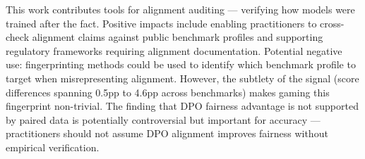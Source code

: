 This work contributes tools for alignment auditing --- verifying how models were trained
after the fact. Positive impacts include enabling practitioners to cross-check alignment
claims against public benchmark profiles and supporting regulatory frameworks requiring
alignment documentation. Potential negative use: fingerprinting methods could be used
to identify which benchmark profile to target when misrepresenting alignment. However,
the subtlety of the signal (score differences spanning 0.5pp to 4.6pp across benchmarks)
makes gaming this fingerprint non-trivial. The finding that DPO fairness advantage is
not supported by paired data is potentially controversial but important for accuracy ---
practitioners should not assume DPO alignment improves fairness without empirical verification.

